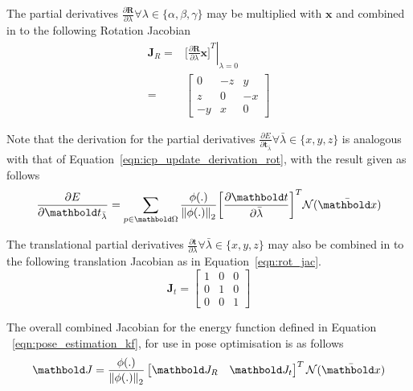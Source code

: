 The partial derivatives
\( \frac{\partial \bm{R}}{\partial \lambda} \forall \lambda \in \{\alpha, \beta, \gamma \} \) 
may be multiplied with \(\bm{x}\) and combined in to the following Rotation Jacobian
\begin{align}
  \label{eqn:rot_jac}
  \bm{J}_{R} ={}& \left. {\bigg[
    \frac{\partial \bm{R}}{\partial \lambda} \bm{x}
    \bigg]}^{T} \right\vert_{\lambda = 0} \\
  ={}&
  \begin{bmatrix}
    0 & -z & y \\
    z & 0 & -x \\
    -y & x & 0
  \end{bmatrix}
\end{align}

Note that the derivation for the partial derivatives
\(\frac{\partial E}{\partial \bm{t}_{\bar{\lambda}}} \forall \bar{\lambda} \in \{x, y, z\} \) 
is analogous with that of Equation~\ref{eqn:icp_update_derivation_rot}, with the result given as 
follows
\begin{equation}
  \label{eqn:icp_update_derivation_trans}
  \frac{\partial E}{\partial \bm{t}_{\bar{\lambda}}} =
  \sum_{p \in \bm{\Omega}}
  \frac{\phi(.)}{\norm{\phi(.)}}
  {\bigg[ \frac{\partial \bm{t}}{\partial \bar{\lambda}}\bigg]}^{T}
  \mathcal{N}(\bar{\bm{x}})
\end{equation}

The translational partial derivatives
\( \frac{\partial \bm{t}}{\partial \lambda} \forall \bar{\lambda} \in \{x, y, z\} \) may also 
be combined in to the following translation Jacobian as in Equation~\ref{eqn:rot_jac}.
\begin{equation}
  \label{eqn:trans_jac}
  \bm{J}_{t} =
  \begin{bmatrix}
    1 & 0 & 0 \\
    0 & 1 & 0 \\
    0 & 0 & 1
  \end{bmatrix}
\end{equation}

The overall combined Jacobian for the energy function defined in Equation
~\ref{eqn:pose_estimation_kf}, for use in pose optimisation is as follows
\begin{equation}
  \label{eqn:pose_jacobian}
  \bm{J} =
  \frac{\phi(.)}{\norm{\phi(.)}}
  \begin{bmatrix}
    \bm{J}_{R} & \bm{J}_{t}
  \end{bmatrix}^{T}
  \mathcal{N}(\bar{\bm{x}})
\end{equation}

